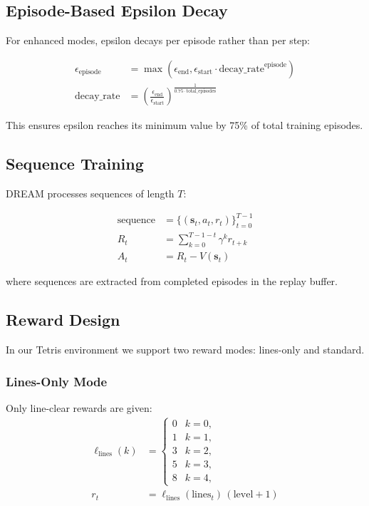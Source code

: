 \documentclass[12pt]{article}
\begin{document}
\subsection{Episode-Based Epsilon Decay}

For enhanced modes, epsilon decays per episode rather than per step:

\begin{align}
\epsilon_{\text{episode}} &= \max(\epsilon_{\text{end}}, \epsilon_{\text{start}} \cdot \text{decay\_rate}^{\text{episode}}) \\
\text{decay\_rate} &= \left(\frac{\epsilon_{\text{end}}}{\epsilon_{\text{start}}}\right)^{\frac{1}{0.75 \cdot \text{total\_episodes}}}
\end{align}

This ensures epsilon reaches its minimum value by 75\% of total training episodes.

\subsection{Sequence Training}

DREAM processes sequences of length $T$:

\begin{align}
\text{sequence} &= \{(\mathbf{s}_t, a_t, r_t)\}_{t=0}^{T-1} \\
R_t &= \sum_{k=0}^{T-1-t} \gamma^k r_{t+k} \\
A_t &= R_t - V(\mathbf{s}_t)
\end{align}

where sequences are extracted from completed episodes in the replay buffer.

\subsection{Reward Design}
In our Tetris environment we support two reward modes: lines-only and standard.

\subsubsection*{Lines-Only Mode}
Only line-clear rewards are given:
\begin{align}
\ell_{\mathrm{lines}}(k) &=
  \begin{cases}0 & k=0,\\
                   1 & k=1,\\
                   3 & k=2,\\
                   5 & k=3,\\
                   8 & k=4,
  \end{cases}
\\
r_t &= \ell_{\mathrm{lines}}(\text{lines}_t)\,(\mathrm{level}+1)
\end{align}
\end{document}
